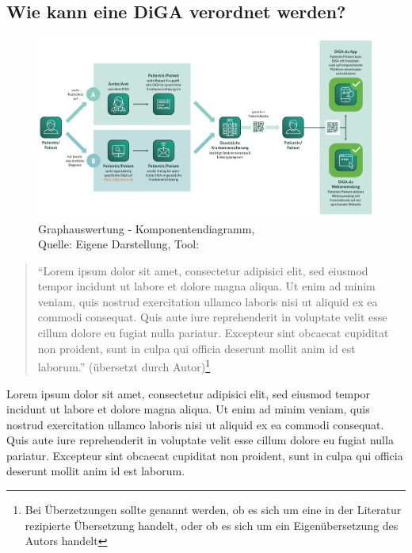 \subsection{Wie kann eine DiGA verordnet werden?}

\begin{figure}[H]
	\centering
	\includegraphics[width=450px, keepaspectratio]{assets/verordnungs_prozess.png}
	\caption{Graphauswertung - Komponentendiagramm,\\Quelle: Eigene Darstellung, Tool: \cite{visual_paradigm}}
\end{figure}
%
\begin{small}
\begin{quote}
"`Lorem ipsum dolor sit amet, consectetur adipisici elit, sed eiusmod tempor incidunt ut labore et dolore magna aliqua. Ut enim ad minim veniam, quis nostrud exercitation ullamco laboris nisi ut aliquid ex ea commodi consequat. Quis aute iure reprehenderit in voluptate velit esse cillum dolore eu fugiat nulla pariatur. Excepteur sint obcaecat cupiditat non proident, sunt in culpa qui officia deserunt mollit anim id est laborum."' (übersetzt durch Autor)\footnote{Bei Überzetzungen sollte genannt werden, ob es sich um eine in der Literatur rezipierte Übersetzung handelt, oder ob es sich um ein Eigenübersetzung des Autors handelt}
\end{quote}
\end{small}
%
Lorem ipsum dolor sit amet, consectetur adipisici elit, sed eiusmod tempor incidunt ut labore et dolore magna aliqua. Ut enim ad minim veniam, quis nostrud exercitation ullamco laboris nisi ut aliquid ex ea commodi consequat. Quis aute iure reprehenderit in voluptate velit esse cillum dolore eu fugiat nulla pariatur. Excepteur sint obcaecat cupiditat non proident, sunt in culpa qui officia deserunt mollit anim id est laborum.\\

